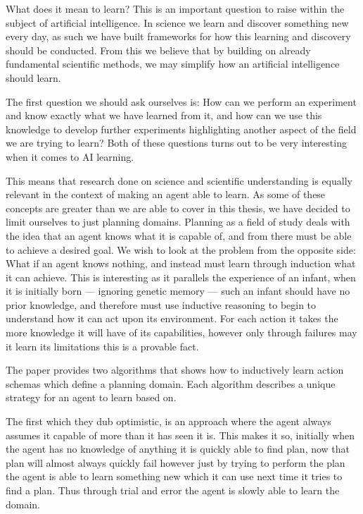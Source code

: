 \documentclass[Master.tex]{subfiles}
\begin{document}
	What does it mean to learn? This is an important question to raise within the subject of artificial intelligence.
	In science we learn and discover something new every day, as such we have built frameworks for how this learning and discovery should be conducted. From this we believe that by building on already fundamental scientific methods, we may simplify how an artificial intelligence should learn.
	
	The first question we should ask ourselves is: How can we perform an experiment and know exactly what we have learned from it, 
	and how can we use this knowledge to develop further experiments highlighting another aspect of the field we are trying to learn?
	Both of these questions turns out to be very interesting when it comes to AI learning.
	
	This means that research done on science and scientific understanding is equally relevant in the context of making an agent able to learn.
	As some of these concepts are greater than we are able to cover in this thesis, we have decided to limit ourselves to just planning domains.	 
	Planning as a field of study deals with the idea that an agent knows what it is capable of, 
	and from there must be able to achieve a desired goal. 
	We wish to look at the problem from the opposite side: What if an agent knows nothing, and instead must learn through induction what it can achieve. 
	This is interesting as it parallels the experience of an infant, when it is initially born  --- ignoring genetic memory --- such an infant should have no prior knowledge, and therefore must use inductive reasoning to begin to understand how it can act upon its environment. For each action it takes the more knowledge it will have of its capabilities, however only through failures may it learn its limitations this is a provable fact.
	 
	
	
	The \cite{Walsh2008} paper provides two algorithms that shows how to inductively learn action schemas which define a planning domain. 
	Each algorithm describes a unique strategy for an agent to learn based on. 
	
	The first which they dub optimistic, is an approach where the agent always assumes it capable of more than it has seen it is. This makes it so, initially when the agent has no knowledge of anything it is quickly able to find plan, now that plan will almost always quickly fail however just by trying to perform the plan the agent is able to learn something new which it can use next time it tries to find a plan. Thus through trial and error the agent is slowly able to learn the domain.
	
\end{document}
